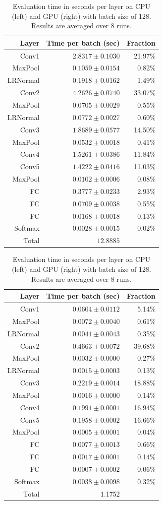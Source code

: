 \begin{table}
\tiny
\parbox{.45\linewidth}{
\centering
\begin{tabular}{rrr}
\hline
Layer & Time per batch (sec) & Fraction \\
\hline
Conv1 & $2.8317 \pm 0.1030 $ & 21.97\% \\
MaxPool & $0.1059 \pm 0.0154$ & 0.82\% \\
LRNormal & $0.1918 \pm 0.0162$ & 1.49\% \\
Conv2 & $4.2626 \pm 0.0740 $ & 33.07\% \\
MaxPool & $0.0705  \pm 0.0029$ & 0.55\% \\
LRNormal & $0.0772\pm 0.0027$ & 0.60\% \\
Conv3 & $1.8689\pm 0.0577$ & 14.50\% \\
MaxPool & $0.0532\pm 0.0018 $ & 0.41\% \\
Conv4 & $1.5261\pm 0.0386$ & 11.84\% \\
Conv5 & $1.4222\pm 0.0416$& 11.03\% \\
MaxPool & $0.0102\pm 0.0006 $ & 0.08\% \\
FC & $0.3777\pm 0.0233$ & 2.93\% \\
FC & $0.0709  \pm 0.0038$ & 0.55\% \\
FC & $0.0168 \pm 0.0018$ & 0.13\% \\
Softmax & $0.0028 \pm 0.0015$ & 0.02\%\\
\hline 
Total & $12.8885$ & \\
\hline
\end{tabular}
}
\parbox{.45\linewidth}{
\centering
\begin{tabular}{rrr}
\hline
Layer & Time per batch (sec) & Fraction \\
\hline
Conv1 & $0.0604 \pm 0.0112$ & 5.14\% \\
MaxPool & $0.0072 \pm 0.0040$ & 0.61\% \\
LRNormal & $0.0041 \pm 0.0043$ &  0.35\% \\
Conv2 & $0.4663 \pm 0.0072$ & 39.68\% \\
MaxPool & $0.0032 \pm 0.0000$ &  0.27\% \\
LRNormal & $0.0015 \pm 0.0003$ & 0.13\% \\
Conv3 & $0.2219 \pm 0.0014$ & 18.88\% \\
MaxPool & $0.0016 \pm 0.0000$ & 0.14\% \\
Conv4 & $0.1991 \pm 0.0001$ & 16.94\% \\
Conv5 & $0.1958 \pm 0.0002$ &  16.66\% \\
MaxPool & $0.0005  \pm 0.0001$ & 0.04\% \\
FC & $0.0077 \pm 0.0013$ & 0.66\% \\
FC & $0.0017 \pm 0.0001$ & 0.14\% \\
FC & $0.0007 \pm 0.0002$  & 0.06\% \\
Softmax & $0.0038 \pm 0.0098$ & 0.32\%\\
\hline 
Total & 1.1752 & \\
\hline
\end{tabular}
}
\caption{Evaluation time in seconds per layer on CPU (left)
  and GPU (right) with batch size of 128. Results are averaged over 8
  runs.} 
\label{evaluation_time}
\end{table}

